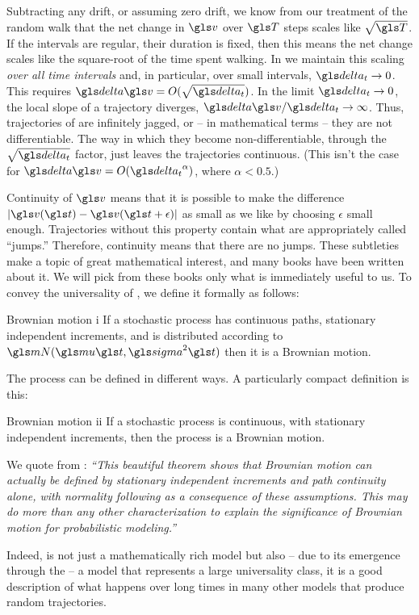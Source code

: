 Subtracting any drift, or assuming zero drift, we know from our treatment of the random walk that the net change in $\gv$ over $\T$ steps scales like $\sqrt{\T}$. If the intervals are regular, \ie their duration is fixed, then this means the net change scales like the square-root of the time spent walking. In \BM we maintain this scaling \textit{over all time intervals} and, in particular, over small intervals, $\dt \to 0$. This requires $\d\gv = O(\sqrt{\dt})$. In the limit $\dt\to0$, the local slope of a trajectory diverges, $\d\gv/\dt\to\infty$. Thus, trajectories of \BM are infinitely jagged, or -- in mathematical terms -- they are not differentiable. The way in which they become non-differentiable, through the $\sqrt{\dt}$ factor, just leaves the trajectories continuous. (This isn't the case for $\d\gv = O(\dt^\alpha)$, where $\alpha < 0.5$.) 

Continuity of $\gv$ means that it is possible to make the difference $|\gv(\t)-\gv(\t+\epsilon)|$ as small as we like by choosing $\epsilon$ small enough. Trajectories without this property contain what are appropriately called ``jumps.'' Therefore, continuity means that there are no jumps. These subtleties make \BM a topic of great mathematical interest, and many books have been written about it. We will pick from these books only what is immediately useful to us. To convey the universality of \BM, we define it formally as follows:
\begin{defn}{Brownian motion i}
If a stochastic process has continuous paths, stationary independent increments, and is distributed according to $\mN(\gmu \t, \gsigma^2 \t)$ then it is a Brownian motion.
\end{defn}
The process can be defined in different ways. A particularly compact definition is this:
\begin{defn}{Brownian motion ii}
If a stochastic process is continuous, with stationary independent increments, then the process is a Brownian motion.
\end{defn}
We quote from \cite{Harrison2013}: {\it ``This beautiful theorem shows that Brownian motion can actually be defined by stationary independent increments and path continuity alone, with normality following as a consequence of these assumptions. This may do more than any other characterization to explain the significance of Brownian motion for probabilistic modeling.''}

Indeed, \BM is not just a mathematically rich model but also -- due to its emergence through the \CLT -- a model that represents a large universality class, \ie it is a good description of what happens over long times in many other models that produce random trajectories. 

